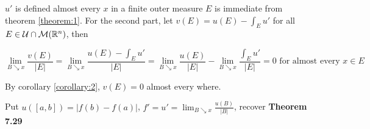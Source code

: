 \documentclass{article}
\begin{document}
$u'$ is defined almost every $x$ in a finite outer measure $E$ is immediate from theorem \ref{theorem:1}. For the second part, let $v(E) = u(E) - \int_E u'$ for all $E \in \mathcal{U} \cap \mathcal{M}(\mathbb{R}^n)$, then 

\[
    \lim_{B \searrow x} \frac{v(E)}{|E|} = \lim_{B \searrow x} \frac{u(E) - \int_E u'}{|E|} = \lim_{B \searrow x} \frac{u(E)}{|E|} - \lim_{B \searrow x} \frac{\int_E u'}{|E|} = 0 \text{ for almost every $x \in E$}
\]

By corollary \ref{corollary:2}, $v(E) = 0$ almost every where.

\begin{remark}
    Put $u([a, b]) = |f(b) - f(a)|$, $f' = u' = \lim_{B \searrow x} \frac{u(B)}{|B|}$, recover \textbf{Theorem 7.29}    
\end{remark}
\end{document}

